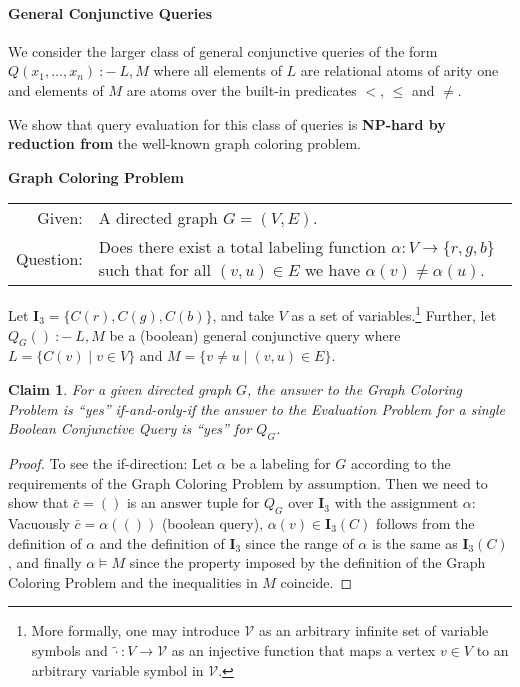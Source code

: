 \documentclass[a4paper,12pt]{article}
\newtheorem{claim}{Claim}
\newcommand{\dbi}{\ensuremath{\mathbf{I}}}
\newcommand{\query}[3]{\ensuremath{{#1}({#2})\:{:}{-}\:{#3}}}
\begin{document}
\paragraph{General Conjunctive Queries}{We consider the larger class of general conjunctive queries of the form $\query{Q}{x_1, \dots, x_n}{L,M}$ where all elements of $L$ are relational atoms of arity one and elements of $M$ are atoms over the built-in predicates $<$, $\leq$ and $\not =$.

We show that query evaluation for this class of queries is \textbf{NP-hard by reduction from} the well-known graph coloring problem.

\begin{center}
\textbf{Graph Coloring Problem}\\[1mm]
\begin{tabular}{rp{14cm}}
Given: & A directed graph $G = (V, E)$. \\
Question: & Does there exist a total labeling function $\alpha : V \rightarrow \{r, g, b\}$ such that for all $(v, u) \in E$ we have $\alpha(v) \not = \alpha(u)$.
\end{tabular}
\end{center}

Let $\dbi_{3} = \{ C(r), C(g), C(b) \}$, and take $V$ as a set of variables.\footnote{More formally, one may introduce $\mathcal{V}$ as an arbitrary infinite set of variable symbols and $\tilde{\cdot} : V \rightarrow \mathcal{V}$ as an injective function that maps a vertex $v \in V$ to an arbitrary variable symbol in $\mathcal{V}$.} Further, let $\query{Q_G}{}{L,M}$ be a (boolean) general conjunctive query where $L = \{ C(v) \mid v \in V \}$ and $M = \{ v \not = u \mid (v, u) \in E\}$.

\begin{claim}
For a given directed graph $G$, the answer to the Graph Coloring Problem is \enquote{yes} if-and-only-if the answer to the Evaluation Problem for a single Boolean Conjunctive Query is \enquote{yes} for $Q_G$.
\end{claim}

\begin{proof}
To see the if-direction: Let $\alpha$ be a labeling for $G$ according to the requirements of the Graph Coloring Problem by assumption. Then we need to show that $\bar{c} = ()$ is an answer tuple for $Q_G$ over $\dbi_3$ with the assignment $\alpha$: Vacuously $\bar{c} = \alpha(())$ (boolean query), $\alpha(v) \in \dbi_3(C)$ follows from the definition of $\alpha$ and the definition of $\dbi_3$ since the range of $\alpha$ is the same as $\dbi_3(C)$, and finally $\alpha \models M$ since the property imposed by the definition of the Graph Coloring Problem and the inequalities in $M$ coincide.


\end{proof}}
\end{document}

